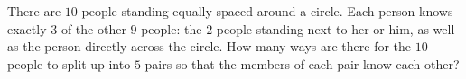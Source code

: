 There are $10$ people standing equally spaced around a circle. Each person knows exactly $3$ of the other $9$ people: the $2$ people standing next to her or him, as well as the person directly across the circle. How many ways are there for the $10$ people to split up into $5$ pairs so that the members of each pair know each other?
